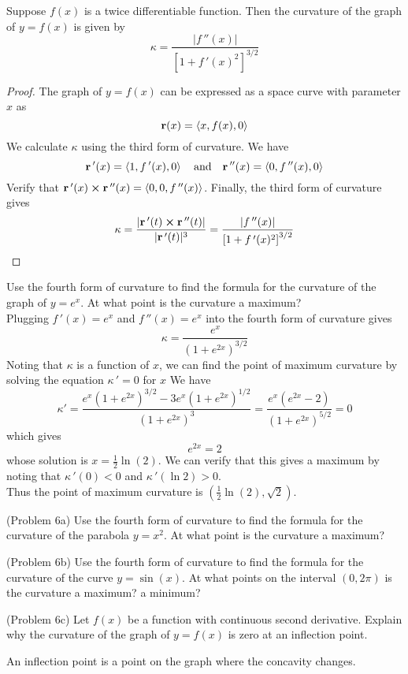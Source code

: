 \documentclass[handout]{ximera}
\begin{document}
\begin{proposition}
Suppose $f(x)$ is a twice differentiable function. Then the curvature of the graph of $y = f(x)$ is given by
\[
\kappa = \frac{|f\,''(x)|}{\left[1+ f\,'(x)^2\right]^{3/2}}
\]
\end{proposition}

\begin{proof}
The graph of $y = f(x)$ can be expressed as a space curve with parameter $x$ as
\[
\mathbf r(x) = \left\langle x, f(x), 0\right\rangle
\]
We calculate $\kappa$ using the third form of curvature. We have
\[
\mathbf r\,'(x) = \left\langle 1, f\,'(x), 0\right\rangle \quad \text{and} \quad \mathbf r\,''(x) = \left\langle 0, f\,''(x), 0\right\rangle 
\]
Verify that $\mathbf r\,'(x) \boldsymbol\times \mathbf r\,''(x) = \left\langle 0,0,f\,''(x)\right\rangle$.
Finally, the third form of curvature gives
\[
\kappa = \frac{|\mathbf r\,'(t) \boldsymbol\times \mathbf r\,''(t)|}{|\mathbf r\,'(t)|^3} = \frac{|f\,''(x)|}{\left[1+ f\,'(x)^2\right]^{3/2}}
\]
\end{proof}

\begin{example}[Example 6]
Use the fourth form of curvature to find the formula for the curvature of the graph of $y = e^x$.  At what point is the curvature a maximum?\\
Plugging $f\,'(x) = e^x$ and $f\,''(x) = e^x$ into the fourth form of curvature gives
\[
\kappa = \frac{e^x}{(1+e^{2x})^{3/2}}
\]
Noting that $\kappa$ is a function of $x$, we can find the point of maximum curvature by solving the equation $\kappa\,' = 0$ for $x$
We have
\[
\kappa ' = \frac{e^x(1+e^{2x})^{3/2} - 3e^x(1+e^{2x})^{1/2}}{(1+e^{2x})^3} = \frac{e^x\left(e^{2x} - 2\right)}{(1+e^{2x})^{5/2}} = 0
\]
which gives
\[
 e^{2x} = 2
\]
whose solution is $ x = \frac12 \ln(2)$. We can verify that this gives a maximum by noting that $\kappa \,' (0) < 0$ and $\kappa \,' (\ln 2) > 0$. \\
Thus the point of maximum curvature is $\left(\frac12 \ln(2), \sqrt 2\right)$.
\end{example}

\begin{problem}(Problem 6a)
Use the fourth form of curvature to find the formula for the curvature of the parabola $y = x^2$.  At what point is the curvature a maximum?\\
\end{problem}

\begin{problem}(Problem 6b)
Use the fourth form of curvature to find the formula for the curvature of the curve $y = \sin(x)$.  
At what points on the interval $(0, 2\pi)$ is the curvature a maximum? a minimum?\\
\end{problem}


\begin{problem}(Problem 6c)
Let $f(x)$ be a function with continuous second derivative. Explain why the curvature of the graph of $y = f(x)$ is zero at an inflection point.\\
\begin{hint}
An inflection point is a point on the graph where the concavity changes.
\end{hint}
\end{problem}
\end{document}
